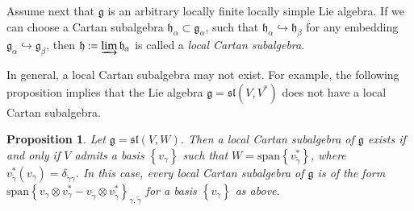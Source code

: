 \documentclass[10pt]{amsart}
\newcounter{theorem}
\newtheorem{prop}[theo]{Proposition}
\renewcommand{\sl}{\mathfrak{sl}}
\newcommand{\hh}{\mathfrak{h}}
\renewcommand{\gg}{\mathfrak{g}}
\renewcommand{\span}{\mathrm{span}}
\begin{document}
\vspace{0.33cm}

Assume next that $\gg$ is an arbitrary locally finite locally simple Lie algebra. If we can choose a Cartan subalgebra $\hh_\alpha\subset\gg_\alpha$, such that $\hh_\alpha\hookrightarrow\hh_\beta$ for 
any embedding $\gg_\alpha \hookrightarrow\gg_\beta$, then $\hh:=\varinjlim\hh_\alpha$ is called a {\it local Cartan subalgebra}.

In general, a local Cartan subalgebra may not exist. For example, the following proposition
implies that the Lie algebra $\gg=\sl(V,V^*)$  does not have a local Cartan subalgebra. 

\begin{prop}\label{prop:1.4.10}
 Let $\gg = \sl(V,W)$. Then a local Cartan subalgebra of $\gg$ exists if and only if 
$V$ admits a basis $\left\lbrace v_\gamma \right\rbrace$ such that $W= \span\left\lbrace v_{\tilde\gamma}^* \right\rbrace$, 
where $v_{\tilde\gamma}^*(v_\gamma) = \delta_{{\tilde{\gamma}}\gamma}$. In this case, every local Cartan subalgebra of 
$\gg$ is of the form $\span\left\lbrace v_\gamma \otimes v_\gamma^* - v_{\tilde\gamma} \otimes v_{\tilde\gamma}^*\right\rbrace_{\gamma,\tilde\gamma}$ 
for a basis $\left\lbrace v_\gamma \right\rbrace$ as above.
\end{prop}
\end{document}
